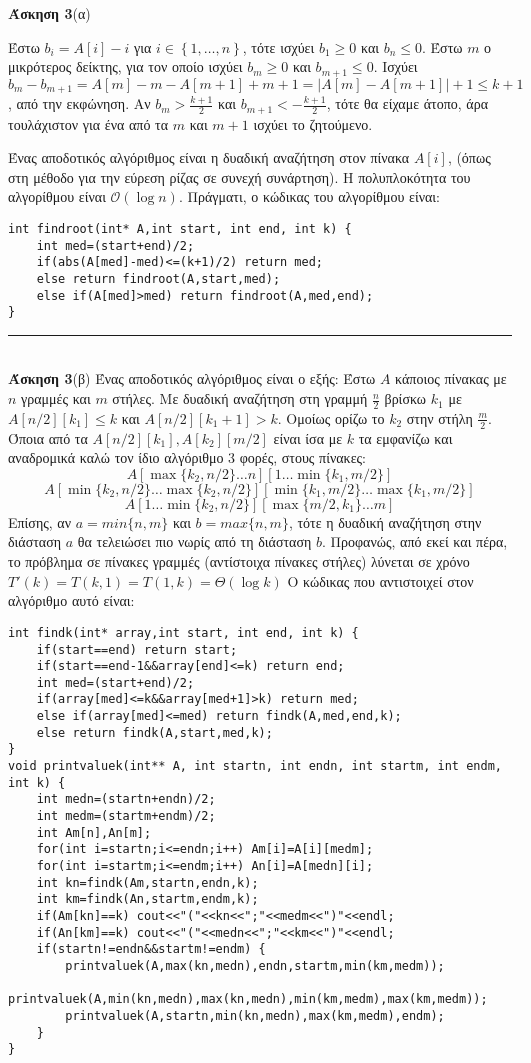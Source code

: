\documentclass[12pt]{article}
\newcommand\bigOh{\mathcal{O}}
\newenvironment{i_enum}{
\begin{enumerate}[label=(\roman{*})]
  \setlength{\itemsep}{0pt}
  \setlength{\parskip}{0pt}
  \setlength{\parsep}{0pt}
}{\end{enumerate}}
\newcommand{\HRule}{\rule{\linewidth}{0.1mm}}
\begin{document}
{\bf Άσκηση 3}(α) 
\begin{i_enum}
\item Έστω $b_i=A[i]-i$ για $i\in\left\{1,\ldots,n\right\}$, τότε ισχύει $b_1\geq0$ και $b_n\leq0$. Έστω $m$ ο μικρότερος δείκτης, για τον οποίο ισχύει $b_m\geq 0$ και $b_{m+1}\leq0$. Ισχύει $b_m-b_{m+1}=A[m]-m-A[m+1]+m+1=\left|A[m]-A[m+1]\right|+1\leq k+1$, από την εκφώνηση. Αν $b_m>\frac{k+1}{2}$ και $b_{m+1}<-\frac{k+1}{2}$, τότε θα είχαμε άτοπο, άρα τουλάχιστον για ένα από τα $m$ και $m+1$ ισχύει το ζητούμενο.
\item Ένας αποδοτικός αλγόριθμος είναι η δυαδική αναζήτηση στον πίνακα $A[i]$, (όπως στη μέθοδο για την εύρεση ρίζας σε συνεχή συνάρτηση). Η πολυπλοκότητα του αλγορίθμου είναι $\bigOh\left(\log n\right)$. Πράγματι, ο κώδικας του αλγορίθμου είναι:
\latintext
\begin{lstlisting}
int findroot(int* A,int start, int end, int k) {
	int med=(start+end)/2;
	if(abs(A[med]-med)<=(k+1)/2) return med;
	else return findroot(A,start,med);
	else if(A[med]>med) return findroot(A,med,end);
}
\end{lstlisting}
\greektext
\end{i_enum}
\HRule\\
{\bf Άσκηση 3}(β) Ένας αποδοτικός αλγόριθμος είναι ο εξής: Έστω $A$ κάποιος πίνακας με $n$ γραμμές και $m$ στήλες. Με δυαδική αναζήτηση στη γραμμή $\frac{n}{2}$ βρίσκω $k_1$ με $A[n/2][k_1]\leq k$ και $A[n/2][k_1+1]>k$. Ομοίως ορίζω το $k_2$ στην στήλη $\frac{m}{2}$. Όποια από τα $A[n/2][k_1],A[k_2][m/2]$ είναι ίσα με $k$ τα εμφανίζω και αναδρομικά καλώ τον ίδιο αλγόριθμο 3 φορές, στους πίνακες:
$$A[\max\{k_2,n/2\}\ldots n][1\ldots\min\{k_1,m/2\}]$$
$$A[\min\{k_2,n/2\}\ldots\max\{k_2,n/2\}][\min\{k_1,m/2\}\ldots\max\{k_1,m/2\}]$$
$$A[1\ldots\min\{k_2,n/2\}][\max\{m/2,k_1\}\ldots m]$$
Επίσης, αν $a=min\{n,m\}$ και $b=max\{n,m\}$, τότε η δυαδική αναζήτηση στην διάσταση $a$ θα τελειώσει πιο νωρίς από τη διάσταση $b$. Προφανώς, από εκεί και πέρα, το πρόβλημα σε πίνακες γραμμές (αντίστοιχα πίνακες στήλες) λύνεται σε χρόνο $T'\left(k\right)=T\left(k,1\right)=T\left(1,k\right)=\Theta\left(\log k\right)$
Ο κώδικας που αντιστοιχεί στον αλγόριθμο αυτό είναι:
\latintext
\begin{lstlisting}
int findk(int* array,int start, int end, int k) {
	if(start==end) return start;
	if(start==end-1&&array[end]<=k) return end;
	int med=(start+end)/2;
	if(array[med]<=k&&array[med+1]>k) return med;
	else if(array[med]<=med) return findk(A,med,end,k);
	else return findk(A,start,med,k);
}
void printvaluek(int** A, int startn, int endn, int startm, int endm, int k) {
	int medn=(startn+endn)/2;
	int medm=(startm+endm)/2;
	int Am[n],An[m];
	for(int i=startn;i<=endn;i++) Am[i]=A[i][medm];
	for(int i=startm;i<=endm;i++) An[i]=A[medn][i];
	int kn=findk(Am,startn,endn,k);
	int km=findk(An,startm,endm,k);
	if(Am[kn]==k) cout<<"("<<kn<<";"<<medm<<")"<<endl;
	if(An[km]==k) cout<<"("<<medn<<";"<<km<<")"<<endl;
	if(startn!=endn&&startm!=endm) {
		printvaluek(A,max(kn,medn),endn,startm,min(km,medm));
		printvaluek(A,min(kn,medn),max(kn,medn),min(km,medm),max(km,medm));
		printvaluek(A,startn,min(kn,medn),max(km,medm),endm);
	}
}
\end{lstlisting}
\end{document}
